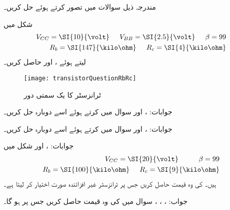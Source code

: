 \newpage
{}
مندرجہ ذیل سوالات میں  تصور کرتے ہوئے حل کریں۔

 
شکل   میں
\begin{align*}
V_{CC}=\SI{10}{\volt} \hspace{5mm} V_{BB}=\SI{2.5}{\volt} \hspace{5mm} \beta=99\\
R_b=\SI{147}{\kilo \ohm} \hspace{5mm} R_c=\SI{4}{\kilo \ohm}
\end{align*}
لیتے ہوئے ،  اور  حاصل کریں۔
\begin{figure}
\centering
\texttt{[image: transistorQuestionRbRc]}
\caption{ ٹرانزسٹر کا یک سمتی دور}
\label{شکل_ٹرانزسٹر_یکسمتی_دور_سوال}
\end{figure}

جوابات: ،  اور 
سوال  میں  کرتے ہوئے اسے دوبارہ حل کریں۔

جوابات: ،  اور 
سوال   میں  کرتے ہوئے اسے دوبارہ حل کریں۔

جوابات: ،  اور 
 
شکل   میں
\begin{align*}
V_{CC}=\SI{20}{\volt} \hspace{5mm}  \hspace{5mm} \beta=99\\
R_b=\SI{100}{\kilo \ohm} \hspace{5mm} R_c=\SI{9}{\kilo \ohm}
\end{align*}
ہیں۔ کی وہ قیمت حاصل کریں جس پر ٹرانزسٹر غیر افزائندہ  صورت اختیار کر لیتا ہے۔

جواب: ، ، ، 
سوال  میں  کی وہ قیمت حاصل کریں جس پر  ہو گا۔

